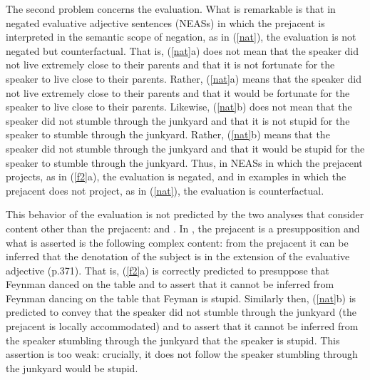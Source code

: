 \documentclass[11pt,fleqn]{article}
\newcommand{\6}{\mbox{$[\hspace*{-.6mm}[$}}
\newcommand{\9}{\mbox{$]\hspace*{-.6mm}]$}}
\begin{document}
The second problem concerns the evaluation. What is remarkable is that in negated evaluative adjective sentences (NEASs) in which the prejacent is interpreted in the semantic scope of negation, as in (\ref{nat}), the evaluation is not negated but counterfactual. That is, (\ref{nat}a) does not mean that the speaker did not live extremely close to their parents and that it is not fortunate for the speaker to live close to their parents. Rather, (\ref{nat}a) means that the speaker did not live extremely close to their parents and that it would be fortunate for the speaker to live close to their parents. Likewise, (\ref{nat}b) does not mean that the speaker did not stumble through the junkyard and that it is not stupid for the speaker to stumble through the junkyard. Rather, (\ref{nat}b) means that the speaker did not stumble through the junkyard and that it would be stupid for the speaker to stumble through the junkyard. Thus, in NEASs in which the prejacent projects, as in (\ref{f2}a), the evaluation is negated, and in examples in which the prejacent does not project, as in (\ref{nat}), the evaluation is counterfactual. 

This behavior of the evaluation is not predicted by the two analyses that consider content other than the prejacent: \citealt{oshima09b} and \citealt{barker02}. In \citealt{oshima09b}, the prejacent is a presupposition and what is asserted is the following complex content: from the prejacent it can be inferred that the denotation of the subject is in the extension of the evaluative adjective (p.371). That is, (\ref{f2}a) is correctly predicted to presuppose that Feynman danced on the table and to assert that it cannot be inferred from Feynman dancing on the table that Feyman is stupid. Similarly then, (\ref{nat}b) is predicted to convey that the speaker did not stumble through the junkyard (the prejacent is locally accommodated) and to assert that it cannot be inferred from the speaker stumbling through the junkyard that the speaker is stupid. This assertion is too weak: crucially, it does not follow the speaker stumbling through the junkyard would be stupid. 
\end{document}
